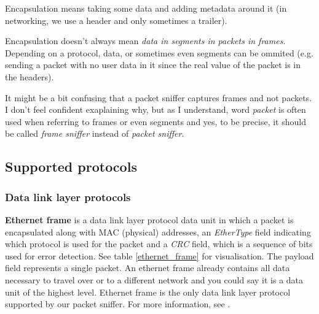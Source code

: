 \documentclass[a4paper]{article}
\begin{document}
  \begin{notes}
    \item Encapsulation means taking some data and adding metadata around it 
      (in networking, we use a header and only sometimes a trailer).
    \item Encapsulation doesn't always mean 
      \textit{data in segments in packets in frames}. Depending on a protocol,
      data, or sometimes even segments can be ommited (e.g. sending a packet 
      with no user data in it since the real value of the packet is in the 
      headers).
    \item It might be a bit confusing that a packet sniffer captures frames and
      not packets. I don't feel confident exaplaining why, but as I understand,
      word \textit{packet} is often used when referring to frames or 
      even segments and yes, to be precise, it should be called 
      \textit{frame sniffer} instead of \textit{packet sniffer}.
  \end{notes}

  \vspace{1cm}


  \subsection{Supported protocols}

  \subsubsection{Data link layer protocols}

  \textbf{Ethernet frame} is a data link layer protocol data unit in 
  which a packet is encapsulated along with MAC (physical) addresses, 
  an \textit{EtherType} field indicating which protocol is used for the packet
  and a \textit{CRC} field, which is a sequence of bits used for error 
  detection. 
  See table \ref{ethernet_frame} for visualisation. The payload field 
  represents a single packet. 
  An ethernet frame already contains all data necessary to travel over or to a 
  different network and you could say it is a data unit of the highest level.
  Ethernet frame is the only data link layer protocol supported by our packet 
  sniffer. 
  For more information, see \cite{wikipedia:ethernet_frame}.
\end{document}
